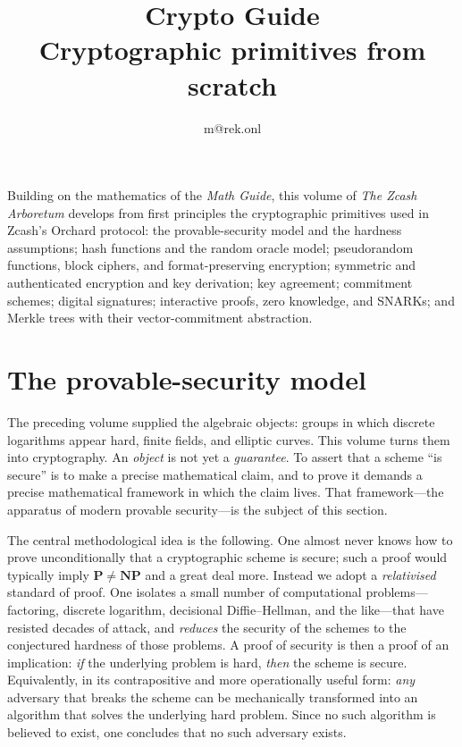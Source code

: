 \documentclass[11pt,a4paper]{article}
\title{\textbf{\Huge Crypto Guide}\\[6pt]\large Cryptographic primitives from scratch}
\author{m@rek.onl}
\date{}
\theoremstyle{definition}
\theoremstyle{remark}
\renewenvironment{abstract}{%
  \small\begin{center}{\bfseries\abstractname}\end{center}\medskip\noindent\ignorespaces
}{\par\medskip}
\begin{document}
\maketitle
\thispagestyle{empty}
\begin{abstract}
Building on the mathematics of the \emph{Math Guide}, this volume of \emph{The Zcash Arboretum} develops from first principles the cryptographic primitives used in Zcash's Orchard protocol: the provable-security model and the hardness assumptions; hash functions and the random oracle model; pseudorandom functions, block ciphers, and format-preserving encryption; symmetric and authenticated encryption and key derivation; key agreement; commitment schemes; digital signatures; interactive proofs, zero knowledge, and SNARKs; and Merkle trees with their vector-commitment abstraction.
\end{abstract}
\clearpage
\tableofcontents
\clearpage
\section{The provable-security model}\label{sec:model}

The preceding volume supplied the algebraic objects: groups in which discrete
logarithms appear hard, finite fields, and elliptic curves. This volume turns
them into cryptography. An \emph{object} is not yet a
\emph{guarantee}. To assert that a scheme ``is secure'' is to make a precise
mathematical claim, and to prove it demands a precise mathematical framework in
which the claim lives. That framework---the apparatus of modern provable
security---is the subject of this section.

The central methodological idea is the following. One almost never knows how to
prove unconditionally that a cryptographic scheme is secure; such a proof would
typically imply \(\mathbf{P} \neq \mathbf{NP}\) and a great deal more. Instead we
adopt a \emph{relativised} standard of proof. One isolates a small number of
computational problems---factoring, discrete logarithm, decisional
Diffie--Hellman, and the like---that have resisted decades of attack, and
\emph{reduces} the security of the schemes to the conjectured hardness of those
problems. A proof of security is then a proof of an implication: \emph{if} the
underlying problem is hard, \emph{then} the scheme is secure. Equivalently, in
its contrapositive and more operationally useful form: \emph{any} adversary that
breaks the scheme can be mechanically transformed into an algorithm that solves
the underlying hard problem. Since no such algorithm is believed to exist, one
concludes that no such adversary exists.
\end{document}
